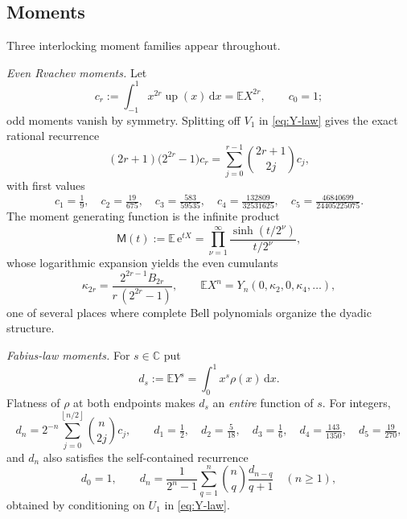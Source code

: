 \documentclass[11pt,oneside]{article}
\numberwithin{equation}{section}
\theoremstyle{definition}
\theoremstyle{remark}
\newcommand{\C}{\mathbb C}
\newcommand{\E}{\mathbb E}
\newcommand{\dd}{\,\mathrm d}
\newcommand{\e}{\mathrm e}
\newcommand{\Up}{\operatorname{up}}
\newcommand{\floor}[1]{\left\lfloor #1\right\rfloor}
\newcommand{\Bell}{Y}
\newcommand{\MM}{\mathsf M}
\begin{document}
\subsection{Moments}
\label{sec:moments}

Three interlocking moment families appear throughout.

\emph{Even Rvachev moments.}  Let
\begin{equation}
 c_r:=\int_{-1}^{1}x^{2r}\Up(x)\dd x=\E X^{2r},
 \qquad c_0=1;
 \label{eq:c-def}
\end{equation}
odd moments vanish by symmetry.  Splitting off $V_1$ in
\eqref{eq:Y-law} gives the exact rational recurrence
\begin{equation}
 (2r+1)\bigl(2^{2r}-1\bigr)c_r
 =\sum_{j=0}^{r-1}\binom{2r+1}{2j}c_j,
 \label{eq:c-recurrence}
\end{equation}
with first values
\begin{equation}
 c_1=\tfrac19,\quad
 c_2=\tfrac{19}{675},\quad
 c_3=\tfrac{583}{59535},\quad
 c_4=\tfrac{132809}{32531625},\quad
 c_5=\tfrac{46840699}{24405225075}.
 \label{eq:c-values}
\end{equation}
The moment generating function is the infinite product
\begin{equation}
 \MM(t):=\E\,\e^{tX}
 =\prod_{\nu=1}^{\infty}\frac{\sinh(t/2^\nu)}{t/2^\nu},
 \label{eq:M-def}
\end{equation}
whose logarithmic expansion yields the even cumulants
\begin{equation}
 \kappa_{2r}=\frac{2^{2r-1}B_{2r}}{r\,(2^{2r}-1)},
 \qquad
 \E X^{n}
 =\Bell_n(0,\kappa_2,0,\kappa_4,\dots),
 \label{eq:cumulants}
\end{equation}
one of several places where complete Bell polynomials organize the
dyadic structure.

\emph{Fabius-law moments.}  For $s\in\C$ put
\begin{equation}
 d_s:=\E Y^{s}=\int_0^1x^{s}\rho(x)\dd x.
 \label{eq:d-def}
\end{equation}
Flatness of $\rho$ at both endpoints makes $d_s$ an \emph{entire}
function of $s$.  For integers,
\begin{equation}
 d_n=2^{-n}\sum_{j=0}^{\floor{n/2}}\binom n{2j}c_j,
 \qquad
 d_1=\tfrac12,\quad d_2=\tfrac5{18},\quad d_3=\tfrac16,\quad
 d_4=\tfrac{143}{1350},\quad d_5=\tfrac{19}{270},
 \label{eq:d-from-c}
\end{equation}
and $d_n$ also satisfies the self-contained recurrence
\begin{equation}
 d_0=1,\qquad
 d_n=\frac{1}{2^{n}-1}
 \sum_{q=1}^{n}\binom nq\frac{d_{n-q}}{q+1}
 \quad(n\ge1),
 \label{eq:d-recurrence}
\end{equation}
obtained by conditioning on $U_1$ in \eqref{eq:Y-law}.
\end{document}
